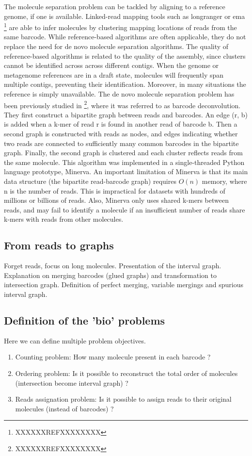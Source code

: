 \documentclass{article}
\begin{document}
The molecule separation problem can be tackled by aligning to a reference genome, if one is available.
Linked-read mapping tools such as longranger or ema \footnote{XXXXXXREFXXXXXXXX} are able to infer molecules by clustering mapping
locations of reads from the same barcode. While reference-based algorithms are often applicable, they do
not replace the need for de novo molecule separation algorithms. The quality of reference-based algorithms
is related to the quality of the assembly, since clusters cannot be identified across across different contigs.
When the genome or metagenome references are in a draft state, molecules will frequently span multiple
contigs, preventing their identification. Moreover, in many situations the reference is simply unavailable.
The de novo molecule separation problem has been previously studied in \footnote{XXXXXXREFXXXXXXXX}, where it was referred to as
barcode deconvolution. They first construct a bipartite graph between reads and barcodes. An edge (r, b) is
added when a k-mer of read r is found in another read of barcode b. Then a second graph is constructed with
reads as nodes, and edges indicating whether two reads are connected to sufficiently many common barcodes
in the bipartite graph. Finally, the second graph is clustered and each cluster reflects reads from the same
molecule. This algorithm was implemented in a single-threaded Python language prototype, Minerva. An
important limitation of Minerva is that its main data structure (the bipartite read-barcode graph) requires
$O(n)$ memory, where n is the number of reads. This is impractical for datasets with hundreds of millions or
billions of reads. Also, Minerva only uses shared k-mers between reads, and may fail to identify a molecule
if an insufficient number of reads share k-mers with reads from other molecules.


\subsection{From reads to graphs}
Forget reads, focus on long molecules. Presentation of the interval graph.
Explanation on merging barcodes (glued graphs) and transformation to intersection graph.
Definition of perfect merging, variable mergings and spurious interval graph.

\subsection{Definition of the 'bio' problems}
Here we can define multiple problem objectives.
\begin{enumerate}
    \item Counting problem: How many molecule present in each barcode ?
    \item Ordering problem: Is it possible to reconstruct the total order of molecules (intersection become interval graph) ?
    \item Reads assignation problem: Is it possible to assign reads to their original molecules (instead of barcodes) ?
\end{enumerate}
\end{document}
